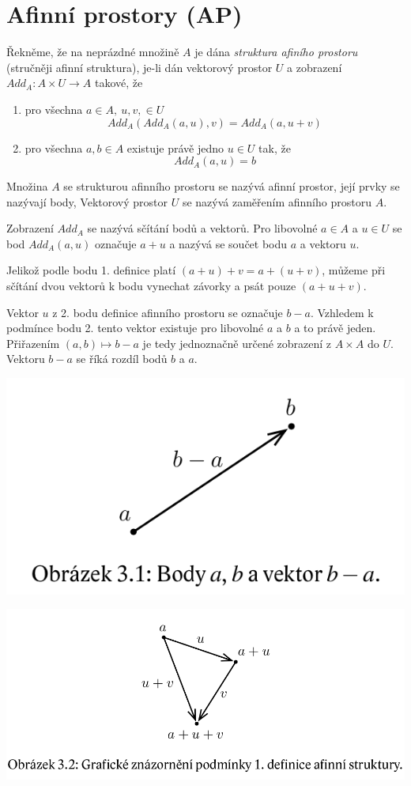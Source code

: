 \documentclass[12pt,a4paper]{article}
\begin{document}
\section{Afinní prostory (AP)}
Řekněme, že na neprázdné množině $A$ je dána \textit{struktura afiního prostoru} (stručněji afinní struktura), je-li dán vektorový prostor $U$ a zobrazení $Add_A : A \times U \rightarrow A$ takové, že 
\begin{enumerate}
	\item pro všechna $a \in A,\ u,v, \in U$ $$Add_A(Add_A(a,u), v) = Add_A(a, u + v)$$
	\item pro všechna $a,b \in A$ existuje právě jedno $u \in U$ tak, že $$Add_A(a,u) = b$$
\end{enumerate}

Množina $A$ se strukturou afinního prostoru se nazývá afinní prostor, její prvky se nazývají body, Vektorový prostor $U$ se nazývá zaměřením afinního prostoru $A$.

Zobrazení $Add_A$ se nazývá sčítání bodů a vektorů. Pro libovolné $a \in A$ a $u \in U$ se bod $Add_A(a, u)$ označuje $a + u$ a nazývá se součet bodu $a$ a vektoru $u$.

Jelikož podle bodu 1. definice platí $(a + u) + v = a + (u + v)$, můžeme při sčítání dvou vektorů k bodu vynechat závorky a psát pouze $(a + u + v)$.

Vektor $u$ z 2. bodu definice afinního prostoru se označuje $b - a$. Vzhledem k podmínce bodu 2. tento vektor existuje pro libovolné $a$ a $b$ a to právě jeden. Přiřazením $(a,b) \mapsto b - a$ je tedy jednoznačně určené zobrazení z $A \times A$ do $U$. Vektoru $b - a$ se říká rozdíl bodů $b$ a $a$.

\begin{center}
	\includegraphics[scale=0.5]{img/Vektor_b-a}
	
	\includegraphics[scale=0.4]{img/definiceAfProst}
\end{center}
\end{document}
